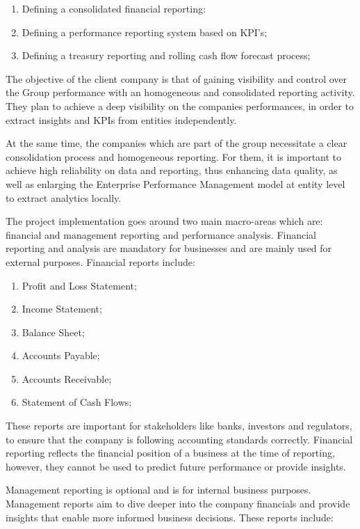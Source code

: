 \documentclass[12pt,a4paper,openright,twoside]{book}
\begin{document}
\begin{enumerate}
    \item Defining a consolidated financial reporting:
    \item Defining a performance reporting system based on KPI’s;
    \item Defining a treasury reporting and rolling cash flow forecast process;
\end{enumerate}

The objective of the client company is that of gaining visibility and control over the Group performance with an homogeneous and consolidated reporting activity.
%
They plan to achieve a deep visibility on the companies performances, in order to extract insights and KPIs from entities independently.

At the same time, the companies which are part of the group necessitate a clear consolidation process and homogeneous reporting.
%
For them, it is important to achieve high reliability on data and reporting, thus enhancing data quality, as well as enlarging the Enterprise Performance Management model at entity level to extract analytics locally.

The project implementation goes around two main macro-areas which are: financial and management reporting and performance analysis.
%
Financial reporting and analysis are mandatory for businesses and are mainly used for external purposes.
%
Financial reports include:

\begin{enumerate}
    \item Profit and Loss Statement;
    \item Income Statement;
    \item Balance Sheet;
    \item Accounts Payable;
    \item Accounts Receivable;
    \item Statement of Cash Flows;
\end{enumerate}

These reports are important for stakeholders like banks, investors and regulators, to ensure that the company is following accounting standards correctly.
%
Financial reporting reflects the financial position of a business at the time of reporting, however, they cannot be used to predict future performance or provide insights.

Management reporting is optional and is for internal business purposes. 
%
Management reports aim to dive deeper into the company financials and provide insights that enable more informed business decisions. 
%
These reports include:
\end{document}
